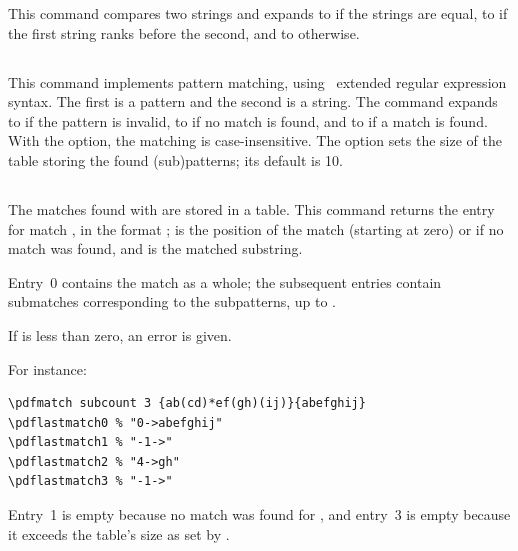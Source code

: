 \documentclass{pdftexmanual}
\begin{document}
This command compares two strings and expands to  if the strings
are equal, to  if the first string ranks before the second, and
to  otherwise.  

\subsection{}

This command implements pattern matching, using \POSIX\ extended regular
expression syntax. The first  is a pattern and
the second is a string. The command expands to  if the pattern
is invalid, to  if no match is found, and to  if a match
is found. With the  option, the matching is
case-insensitive. The  option sets the size of the table
storing the found (sub)patterns; its default is 10. 

\subsection{}

The matches found with  are stored in a table. This command
returns the entry for match , in the format
\type{->};  is
the position of the match (starting at zero) or  if no match
was found, and  is the matched substring.

Entry~0 contains the match as a whole; the subsequent entries contain
submatches corresponding to the subpatterns, up to .

If  is less than zero, an error is given.

For instance:

\begin{verbatim}
\pdfmatch subcount 3 {ab(cd)*ef(gh)(ij)}{abefghij}
\pdflastmatch0 % "0->abefghij"
\pdflastmatch1 % "-1->"
\pdflastmatch2 % "4->gh"
\pdflastmatch3 % "-1->"
\end{verbatim}

Entry~1 is empty because no match was found for , and entry~3
is empty because it exceeds the table's size as set by .
\end{document}
